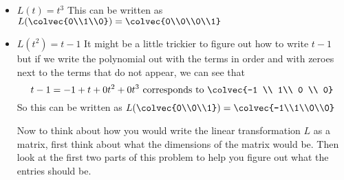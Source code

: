 {\begin{itemize}
\item$L(t) = t^3$ This can be written as 
$ L (\colvec{0\\1\\0}) = \colvec{0\\0\\0\\1}$

\item$L(t^2) = t-1$ It might be a little trickier to figure out how to write $t-1$ but if we write the polynomial out with the terms in order and with zeroes next to the terms that do not appear, we can see that 
\[ t-1 = -1 + t +0t^2 + 0t^3 \text{ corresponds to } \colvec{-1 \\ 1\\ 0 \\ 0}\]
So this can be written as 
$ L (\colvec{0\\0\\1}) = \colvec{-1\\1\\0\\0}$

Now to think about how you would write the linear transformation $L$ as a matrix, first think about what the dimensions of the matrix would be. Then look at the first two parts of this problem to help you figure out what the entries should be.


\end{itemize}


} %

